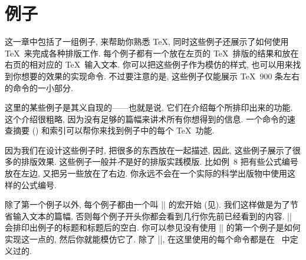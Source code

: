 

\chapter{例子}



这一章中包括了一组例子, 来帮助你熟悉 \TeX, 同时这些例子还展示了如何使用 \TeX\ 来完成各种排版工作.
每个例子都有一个放在左页的 \TeX\ 排版的结果和放在右页的相对应的 \TeX\ 输入文本.
你可以把这些例子作为模仿的样式, 也可以用来找到你想要的效果的实现命令.
不过要注意的是, 这些例子仅能展示 \TeX\ $900$ 条左右的命令的一小部分.

这里的某些例子是其义自现的——也就是说, 它们在介绍每个所排印出来的功能.
这个介绍很粗略, 因为没有足够的篇幅来讲术所有你想得到的信息.
一个命令的速查摘要 () 和索引可以帮你来找到例子中的每个 \TeX\ 功能.

因为我们在设计这些例子时, 把很多的东西放在一起描述,
因此, 这些例子展示了很多的排版效果.
这些例子一般并\emph{不}是好的排版实践模版.
比如例~8 把有些公式编号放在左边, 又把另一些放在了右边.
你永远不会在一个实际的科学出版物中使用这样的公式编号.

除了第一个例子以外, 每个例子都由一个叫 |\xmpheader| 的宏开始 (见).
我们这样做是为了节省输入文本的篇幅,
否则每个例子开头你都会看到几行你先前已经看到的内容.
|\xmpheader| 会排印出例子的标题和标题后的空白.
你可以参见没有使用 |\xmpheader| 的第一个例子是如何实现这一点的,
然后你就能模仿它了.
除了 |\xmpheader|, 在这里使用的每个命令都是在 \PlainTeX\ 中定义过的.

{%
   \let\bye = \relax %
}%


\endchapter
\byebye
